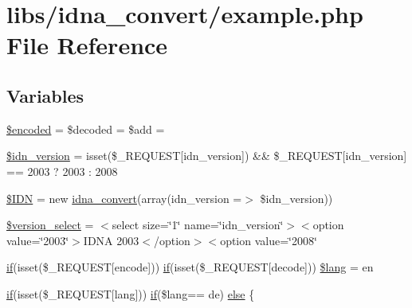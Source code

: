 \hypertarget{example_8php}{}\section{libs/idna\+\_\+convert/example.php File Reference}
\label{example_8php}
\subsection*{Variables}
\begin{DoxyCompactItemize}
\item 
\hyperlink{example_8php_af709b460501204e2ec7e34e96e7de576}{\$encoded} = \$decoded = \$add = \textquotesingle{}\textquotesingle{}
\item 
\hyperlink{example_8php_aaa64132973e10962c52265cfbee1cb9c}{\$idn\+\_\+version} = isset(\$\+\_\+\+R\+E\+Q\+U\+E\+S\+T\mbox{[}\textquotesingle{}idn\+\_\+version\textquotesingle{}\mbox{]}) \&\& \$\+\_\+\+R\+E\+Q\+U\+E\+S\+T\mbox{[}\textquotesingle{}idn\+\_\+version\textquotesingle{}\mbox{]} == 2003 ? 2003 \+: 2008
\item 
\hyperlink{example_8php_aa45ac61e5ada434ea385befcd1aea16d}{\$\+I\+D\+N} = new \hyperlink{classidna__convert}{idna\+\_\+convert}(array(\textquotesingle{}idn\+\_\+version\textquotesingle{} =$>$ \$idn\+\_\+version))
\item 
\hyperlink{example_8php_a13d9753a348e3a016c3d8fb1ac173bbd}{\$version\+\_\+select} = \textquotesingle{}$<$select size=\char`\"{}1\char`\"{} name=\char`\"{}idn\+\_\+version\char`\"{}$>$$<$option value=\char`\"{}2003\char`\"{}$>$I\+D\+N\+A 2003$<$/option$>$$<$option value=\char`\"{}2008\char`\"{}\textquotesingle{}
\item 
\hyperlink{point__level__icon_8addon_8php_a29031816e50a8f742422e671b2bef9b2}{if}(isset(\$\+\_\+\+R\+E\+Q\+U\+E\+S\+T\mbox{[}\textquotesingle{}encode\textquotesingle{}\mbox{]})) \hyperlink{point__level__icon_8addon_8php_a29031816e50a8f742422e671b2bef9b2}{if}(isset(\$\+\_\+\+R\+E\+Q\+U\+E\+S\+T\mbox{[}\textquotesingle{}decode\textquotesingle{}\mbox{]})) \hyperlink{example_8php_aef99014231eb219a8c774eb4b8463fd9}{\$lang} = \textquotesingle{}en\textquotesingle{}
\item 
\hyperlink{point__level__icon_8addon_8php_a29031816e50a8f742422e671b2bef9b2}{if}(isset(\$\+\_\+\+R\+E\+Q\+U\+E\+S\+T\mbox{[}\textquotesingle{}lang\textquotesingle{}\mbox{]})) \hyperlink{point__level__icon_8addon_8php_a29031816e50a8f742422e671b2bef9b2}{if}(\$lang== \textquotesingle{}de\textquotesingle{}) \hyperlink{example_8php_a62bf8b36de1aa08b54e9822dc49899aa}{else} \{
\end{DoxyCompactItemize}


